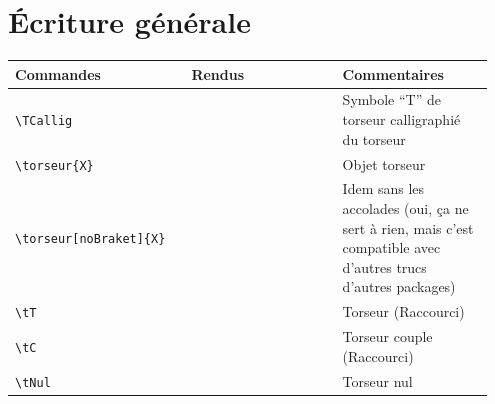 \documentclass[a4paper,10pt]{article}
\newcommand{\rac}{({\color{red}Raccourci})}
\begin{document}
	\section{Écriture générale}
	\noindent
	\begin{tabular}{|p{0.35\linewidth}|p{0.3\linewidth}|p{0.3\linewidth}|}
		\hline
			\textbf{Commandes}&\textbf{Rendus}&\textbf{Commentaires}
		\\\hline\hline
			\verb!\TCallig!			&	\TCallig		&	Symbole ``T'' de torseur calligraphié du torseur
		\\\hline
			\verb!\torseur{X}!		&	\torseur{X}		&	Objet torseur
		\\\hline
			\verb!\torseur[noBraket]{X}!		&	\torseur[noBraket]{X}		&	Idem sans les accolades (oui, ça ne sert à rien, mais c'est compatible avec d'autres trucs d'autres packages)
		\\\hline
			\verb!\tT!			&	\tT			&	Torseur \TCallig \rac
		\\\hline
			\verb!\tC!			&	\tC			&	Torseur couple \rac
		\\\hline
			\verb!\tNul!			&	\tNul			&	Torseur nul
		\\\hline
	\end{tabular}
\end{document}
